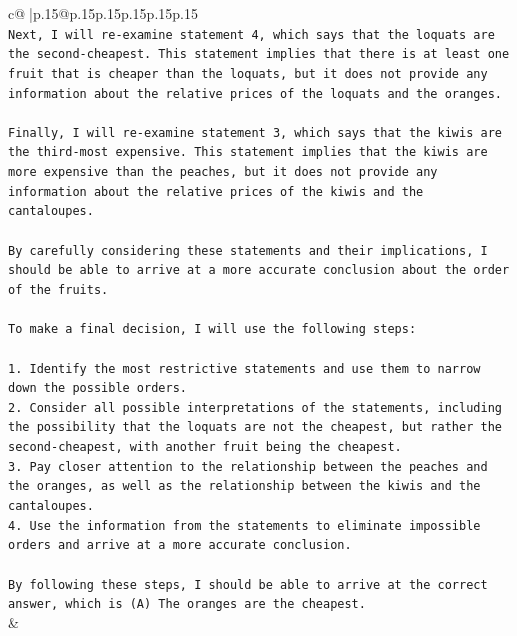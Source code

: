 \documentclass{article}
\begin{document}
{\begin{supertabular}{c@{$\;$}|p{.15\linewidth}@{}p{.15\linewidth}p{.15\linewidth}p{.15\linewidth}p{.15\linewidth}p{.15\linewidth}}
{{{\\ 
\texttt{Next, I will re{-}examine statement 4, which says that the loquats are the second{-}cheapest. This statement implies that there is at least one fruit that is cheaper than the loquats, but it does not provide any information about the relative prices of the loquats and the oranges.} \\
\\ 
\texttt{Finally, I will re{-}examine statement 3, which says that the kiwis are the third{-}most expensive. This statement implies that the kiwis are more expensive than the peaches, but it does not provide any information about the relative prices of the kiwis and the cantaloupes.} \\
\\ 
\texttt{By carefully considering these statements and their implications, I should be able to arrive at a more accurate conclusion about the order of the fruits.} \\
\\ 
\texttt{To make a final decision, I will use the following steps:} \\
\\ 
\texttt{1. Identify the most restrictive statements and use them to narrow down the possible orders.} \\
\texttt{2. Consider all possible interpretations of the statements, including the possibility that the loquats are not the cheapest, but rather the second{-}cheapest, with another fruit being the cheapest.} \\
\texttt{3. Pay closer attention to the relationship between the peaches and the oranges, as well as the relationship between the kiwis and the cantaloupes.} \\
\texttt{4. Use the information from the statements to eliminate impossible orders and arrive at a more accurate conclusion.} \\
\\ 
\texttt{By following these steps, I should be able to arrive at the correct answer, which is (A) The oranges are the cheapest.} \\
            }
        }
    }
    & \\ \\

\end{supertabular}
}
\end{document}
